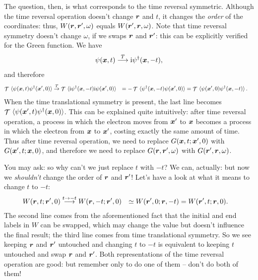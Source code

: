 \documentclass[hyperref, a4paper, 12pt]{report}
\DeclareMathOperator{\timeorder}{\mathcal{T}}
\newcommand*{\ii}{\mathrm{i}}
\def\\{}%
\begin{document}
The question, then, is what corresponds to the time reversal symmetric.
Although the time reversal operation doesn't change $\vb*{r}$ and $t$,
it changes the \emph{order} of the coordinates:
thus, $W(\vb*{r}, \vb*{r}', \omega)$ equals $W(\vb*{r}', \vb*{r}, \omega)$.
Note that time reversal symmetry doesn't change $\omega$, 
if we swaps $\vb*{r}$ and $\vb*{r}'$:
this can be explicitly verified for the Green function.
We have 
\begin{equation}
    \psi(\vb*{x}, t) \stackrel{T}{\longrightarrow} \ii \psi^\dagger (\vb*{x}, -t),
\end{equation}
and therefore 
\begin{equation}
    \begin{aligned}
        \timeorder \expval*{\psi(\vb*{x}, t) \psi^\dagger(\vb*{x}', 0)} 
        &\stackrel{T}{\rightarrow} 
        \timeorder \expval*{\ii \psi^\dagger(\vb*{x}, - t) \ii \psi(\vb*{x}', 0)} \\
        &= - \timeorder \expval*{\psi^\dagger(\vb*{x}, - t) \psi(\vb*{x}', 0)} \\
        &= \timeorder \expval*{\psi(\vb*{x}', 0) \psi^\dagger(\vb*{x}, - t)}.
    \end{aligned}
\end{equation}
When the time translational symmetry is present, 
the last line becomes 
$\timeorder \expval*{\psi(\vb*{x}', t) \psi^\dagger(\vb*{x}, 0)}$.
This can be explained quite intuitively:
after time reversal operation,
a process in which the electron moves from $\vb*{x}'$ to $\vb*{x}$
becomes a process in which the electron from $\vb*{x}$ to $\vb*{x}'$,
costing exactly the same amount of time.
Thus after time reversal operation, 
we need to replace $G(\vb*{x}, t; \vb*{x}', 0)$
with $G(\vb*{x}', t; \vb*{x}, 0)$,
and therefore we need to replace 
$G(\vb*{r}, \vb*{r}', \omega)$ 
with $G(\vb*{r}', \vb*{r}, \omega)$.

You may ask: so why can't we just replace $t$ with $-t$?
We can, actually: but now we \emph{shouldn't} change the order of $\vb*{r}$ and $\vb*{r}'$!
Let's have a look at what it means to change $t$ to $-t$:
\[
    \begin{aligned}
        W(\vb*{r}, t; \vb*{r}', 0) 
        &\stackrel{t \to -t}{\longrightarrow} W(\vb*{r}, -t; \vb*{r}', 0) \\
        &\simeq  W(\vb*{r}', 0; \vb*{r}, -t) \\
        &=       W(\vb*{r}', t; \vb*{r}, 0)  .
    \end{aligned}
\]
The second line comes from the aforementioned fact that 
the initial and end labels in $W$ can be swapped, 
which may change the value 
but doesn't influence the final result;
the third line comes from time translational symmetry.
So we see keeping $\vb*{r}$ and $\vb*{r}'$ untouched 
and changing $t$ to $-t$ 
is equivalent to 
keeping $t$ untouched 
and swap $\vb*{r}$ and $\vb*{r}'$.
Both representations of the time reversal operation are good:
but remember only to do one of them -- don't do both of them!
\end{document}
